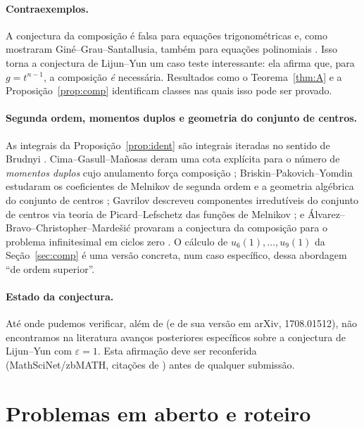 \documentclass[11pt]{article}
\theoremstyle{plain}
\theoremstyle{definition}
\theoremstyle{remark}
\begin{document}
\paragraph{Contraexemplos.}
A conjectura da composição é falsa para equações trigonométricas
\cite{Alw09,GGS14} e, como mostraram Giné--Grau--Santallusia, também para
equações polinomiais \cite{GGS19}. Isso torna a conjectura de Lijun--Yun um caso
teste interessante: ela afirma que, para $g=t^{n-1}$, a composição \emph{é}
necessária. Resultados como o Teorema~\ref{thm:A} e a
Proposição~\ref{prop:comp} identificam classes nas quais isso pode ser provado.

\paragraph{Segunda ordem, momentos duplos e geometria do conjunto de centros.}
As integrais da Proposição~\ref{prop:ident} são integrais iteradas no sentido de
Brudnyi \cite{Bru06}. Cima--Gasull--Mañosas deram uma cota explícita para o
número de \emph{momentos duplos} cujo anulamento força composição
\cite{CGM13a,CGM13b}; Briskin--Pakovich--Yomdin estudaram os coeficientes de
Melnikov de segunda ordem e a geometria algébrica do conjunto de centros
\cite{BPY16}; Gavrilov descreveu componentes irredutíveis do conjunto de centros
via teoria de Picard--Lefschetz das funções de Melnikov \cite{Gav20}; e
Álvarez--Bravo--Christopher--Mardešić provaram a conjectura da composição para o
problema infinitesimal em ciclos zero \cite{ABCM21}. O cálculo de
$u_6(1),\dots,u_9(1)$ da Seção~\ref{sec:comp} é uma versão concreta, num caso
específico, dessa abordagem ``de ordem superior''.

\paragraph{Estado da conjectura.}
Até onde pudemos verificar, além de \cite{ALA20} (e de sua versão em arXiv,
1708.01512), não encontramos na literatura avanços posteriores específicos sobre
a conjectura de Lijun--Yun com $\varepsilon=1$. Esta afirmação deve ser
reconferida (MathSciNet/zbMATH, citações de \cite{ALA20}) antes de qualquer
submissão.

\section{Problemas em aberto e roteiro}\label{sec:abertos}
\end{document}
